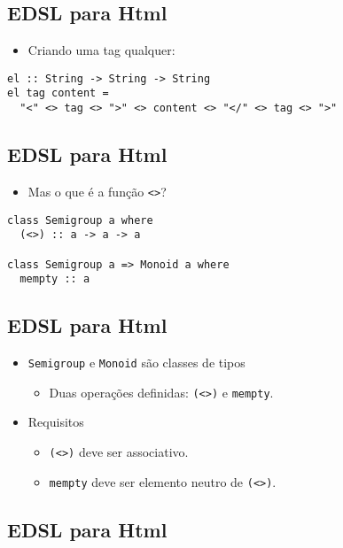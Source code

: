 \documentclass[11pt]{article}
\begin{document}
\subsection*{EDSL para Html}
\label{sec:org426c961}

\begin{itemize}
\item Criando uma tag qualquer:
\end{itemize}

\begin{verbatim}
el :: String -> String -> String
el tag content =
  "<" <> tag <> ">" <> content <> "</" <> tag <> ">"
\end{verbatim}
\subsection*{EDSL para Html}
\label{sec:org281788c}

\begin{itemize}
\item Mas o que é a função \texttt{<>}?
\end{itemize}

\begin{verbatim}
class Semigroup a where
  (<>) :: a -> a -> a

class Semigroup a => Monoid a where
  mempty :: a
\end{verbatim}
\subsection*{EDSL para Html}
\label{sec:orgdeae22e}

\begin{itemize}
\item \texttt{Semigroup} e \texttt{Monoid} são classes de tipos 
\begin{itemize}
\item Duas operações definidas: \texttt{(<>)} e \texttt{mempty}.
\end{itemize}
\item Requisitos
\begin{itemize}
\item \texttt{(<>)} deve ser associativo.
\item \texttt{mempty} deve ser elemento neutro de \texttt{(<>)}.
\end{itemize}
\end{itemize}
\subsection*{EDSL para Html}
\label{sec:org64f0553}
\end{document}
